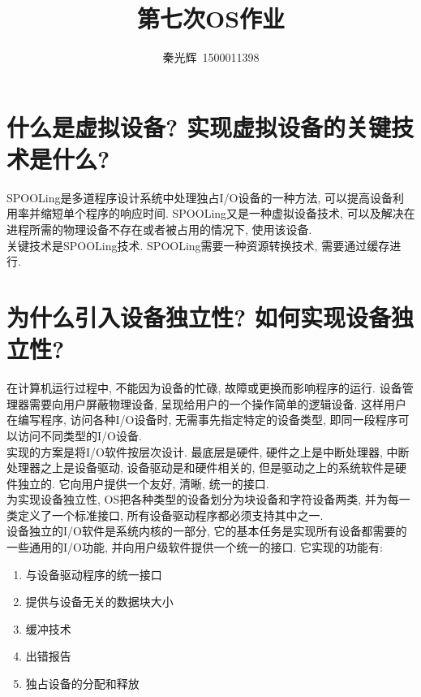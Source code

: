 \documentclass[a4paper, 12pt, notitlepage]{article}
\begin{document}
\title{第七次OS作业}
\author{秦光辉\ 1500011398}
\maketitle

\section{什么是虚拟设备? 实现虚拟设备的关键技术是什么?}

	SPOOLing是多道程序设计系统中处理独占I/O设备的一种方法, 可以提高设备利用率并缩短单个程序的响应时间. SPOOLing又是一种虚拟设备技术, 可以及解决在进程所需的物理设备不存在或者被占用的情况下, 使用该设备. \\
	
	关键技术是SPOOLing技术. SPOOLing需要一种资源转换技术, 需要通过缓存进行. \\
	
\section{为什么引入设备独立性? 如何实现设备独立性?}

	在计算机运行过程中, 不能因为设备的忙碌, 故障或更换而影响程序的运行. 设备管理器需要向用户屏蔽物理设备, 呈现给用户的一个操作简单的逻辑设备. 这样用户在编写程序, 访问各种I/O设备时, 无需事先指定特定的设备类型, 即同一段程序可以访问不同类型的I/O设备. \\
	
	实现的方案是将I/O软件按层次设计. 最底层是硬件, 硬件之上是中断处理器, 中断处理器之上是设备驱动, 设备驱动是和硬件相关的, 但是驱动之上的系统软件是硬件独立的. 它向用户提供一个友好, 清晰, 统一的接口. \\
	
	为实现设备独立性, OS把各种类型的设备划分为块设备和字符设备两类, 并为每一类定义了一个标准接口, 所有设备驱动程序都必须支持其中之一. \\
	
	设备独立的I/O软件是系统内核的一部分, 它的基本任务是实现所有设备都需要的一些通用的I/O功能, 并向用户级软件提供一个统一的接口. 它实现的功能有: 
	
\begin{enumerate}
	\item 与设备驱动程序的统一接口
	\item 提供与设备无关的数据块大小
	\item 缓冲技术
	\item 出错报告
	\item 独占设备的分配和释放
\end{enumerate}
\end{document}
